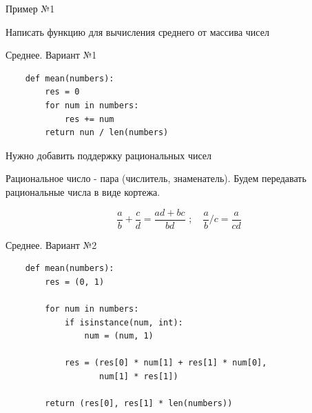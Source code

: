 \documentclass{article}
\begin{document}
\LARGE
\begin{center} Пример №1 \end{center}
    Написать функцию для вычисления среднего от массива чисел
\newpage

\begin{center} Среднее. Вариант №1 \end{center}
\begin{lstlisting}
    def mean(numbers):
        res = 0
        for num in numbers:
            res += num
        return nun / len(numbers)
\end{lstlisting}
\newpage

\begin{center} Нужно добавить поддержку рациональных чисел \end{center}
Рациональное число - пара (числитель, знаменатель). Будем передавать
рациональные числа в виде кортежа.

$$
\frac{a}{b} + \frac{c}{d} = \frac{ad + bc}{bd}\,\,;
\quad
\frac{a}{b} / c = \frac{a}{cd}
$$
\newpage

\begin{center} Среднее. Вариант №2 \end{center}
\begin{lstlisting}
    def mean(numbers):
        res = (0, 1)

        for num in numbers:
            if isinstance(num, int):
                num = (num, 1)

            res = (res[0] * num[1] + res[1] * num[0], 
                   num[1] * res[1])

        return (res[0], res[1] * len(numbers))
\end{lstlisting}
\newpage
\end{document}

